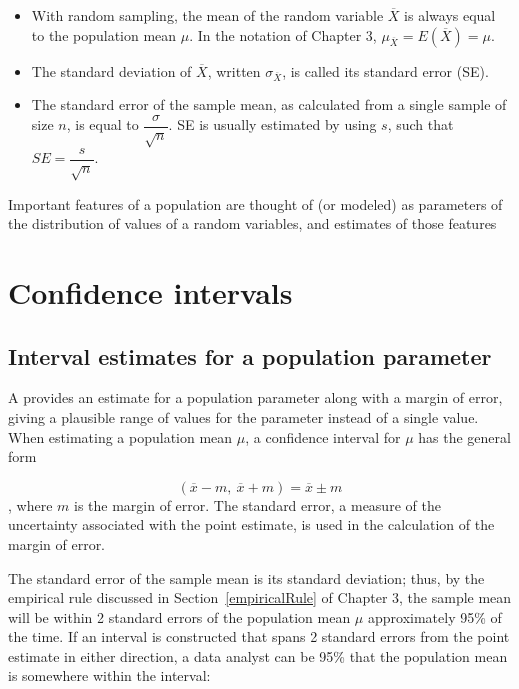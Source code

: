 \begin{spacing}{1.5}
\begin{itemize}
	\item With random sampling, the mean of the random variable $\overline{X}$ is always equal to the population mean $\mu$.  In the notation of Chapter 3, $\mu_{\overline{X}} = E(\overline{X}) = \mu$.
	
	\item  The standard deviation of $\overline{X}$, written $\sigma_{\overline{X}}$, is called its standard error (SE). 
	
	\item The standard error of the sample mean, as calculated from a single sample of size $n$, is equal to $\dfrac{\sigma}{\sqrt{n}}$. SE is usually estimated by using $s$, such that $SE = \dfrac{s}{\sqrt{n}}$.
	
\end{itemize}

Important features of a population are thought of (or modeled) as parameters of the distribution of values of a random variables, and estimates of those features 


\section[Confidence intervals]{Confidence intervals} %
\label{confidenceIntervals}
\subsection{Interval estimates for a population parameter}

A  provides an estimate for a population parameter along with a margin of error, giving a plausible range of values for the parameter instead of a single value. When estimating a population mean $\mu$, a confidence interval for $\mu$ has the general form

\[(\overline{x} -m, \ \overline{x} + m) = \overline{x} \pm m \],
where $m$ is the margin of error. The standard error, a measure of the uncertainty associated with the point estimate, is used in the calculation of the margin of error.


The standard error of the sample mean is its standard deviation; thus, by the empirical rule discussed in Section~\ref{empiricalRule} of Chapter 3, the sample mean will be within 2 standard errors of the population mean $\mu$ approximately 95\% of the time. If an interval is constructed that spans 2 standard errors from the point estimate in either direction, a data analyst can be 95\%  that the population mean is somewhere within the interval:


\end{spacing}
